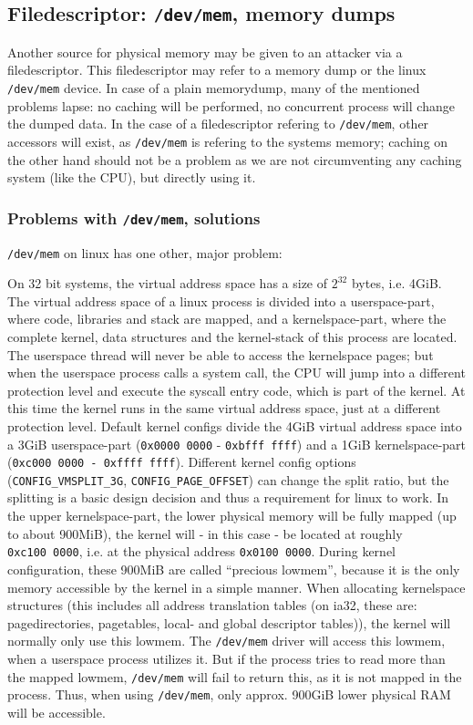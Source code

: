 \subsection{Filedescriptor: \texttt{/dev/mem}, memory dumps}

Another source for physical memory may be given to an attacker via a
filedescriptor. This filedescriptor may refer to a memory dump or the linux
\texttt{/dev/mem} device. In case of a plain memorydump, many of the mentioned
problems lapse: no caching will be performed, no concurrent process will change
the dumped data. In the case of a filedescriptor refering to \texttt{/dev/mem},
other accessors will exist, as \texttt{/dev/mem} is refering to the systems
memory; caching on the other hand should not be a problem as we are not
circumventing any caching system (like the CPU), but directly using it.

\subsubsection{Problems with \texttt{/dev/mem}, solutions}

\texttt{/dev/mem} on linux has one other, major problem:

\label{kerneluserdivision} On 32 bit systems, the virtual address space has a
size of $2^{32}$ bytes, i.e.  4GiB.  The virtual address space of a linux
process is divided into a userspace-part, where code, libraries and stack are
mapped, and a kernelspace-part, where the complete kernel, data structures and
the kernel-stack of this process are located. The userspace thread will never be
able to access the kernelspace pages; but when the userspace process calls a
system call, the CPU will jump into a different protection level and execute the
syscall entry code, which is part of the kernel. At this time the kernel runs in
the same virtual address space, just at a different protection level. Default
kernel configs divide the 4GiB virtual address space into a 3GiB userspace-part
(\texttt{0x0000~0000} - \texttt{0xbfff~ffff}) and a 1GiB kernelspace-part
(\texttt{0xc000~0000 - 0xffff~ffff}).  Different kernel config options
(\texttt{CONFIG\_VMSPLIT\_3G}, \texttt{CONFIG\_PAGE\_OFFSET}) can change the
split ratio, but the splitting is a basic design decision and thus a requirement
for linux to work. In the upper kernelspace-part, the lower physical memory will
be fully mapped (up to about 900MiB), the kernel will - in this case - be
located at roughly \texttt{0xc100~0000}, i.e. at the physical address
\texttt{0x0100~0000}. During kernel configuration, these 900MiB are called
``precious lowmem'', because it is the only memory accessible by the kernel in a
simple manner. When allocating kernelspace structures (this includes all address
translation tables (on ia32, these are: pagedirectories, pagetables, local- and
global descriptor tables)\label{linuxATTinlowmem}), the kernel will normally
only use this lowmem.  The \texttt{/dev/mem} driver will access this lowmem,
when a userspace process utilizes it. But if the process tries to read more than
the mapped lowmem, \texttt{/dev/mem} will fail to return this, as it is not
mapped in the process.  Thus, when using \texttt{/dev/mem}, only approx. 900GiB
lower physical RAM will be accessible.

